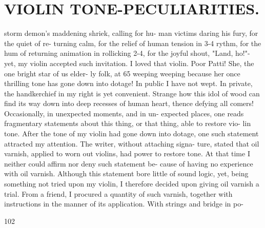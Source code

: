 \documentclass{article}
\begin{document}
\section*{VIOLIN TONE-PECULIARITIES.}
storm demon's maddening shriek, calling for hu- man victims daring his fury, for the quiet of re- turning calm, for the relief of human tension in 3-4 rythm, for the hum of returning animation in rollicking 2-4, for the joyful shout, "Land, ho!"- yet, my violin accepted such invitation. I loved that violin. Poor Patti! She, the one bright star of us elder- ly folk, at 65 weeping weeping because her once thrilling tone has gone down into dotage! In public I have not wept. In private, the handkerchief in my right is yet convenient. Strange how this idol of wood can find its way down into deep recesses of human heart, thence defying all comers! Occasionally, in unexpected moments, and in un- expected places, one reads fragmentary statements about this thing, or that thing, able to restore vio- lin tone. After the tone of my violin had gone down into dotage, one such statement attracted my attention. The writer, without attaching signa- ture, stated that oil varnish, applied to worn out violins, had power to restore tone. At that time I neither could affirm nor deny such statement be- cause of having no experience with oil varnish. Although this statement bore little of sound logic, yet, being something not tried upon my violin, I therefore decided upon giving oil varnish a trial. From a friend, I procured a quantity of such varnish, together with instructions in the manner of its application. With strings and bridge in po-

102
\end{document}
